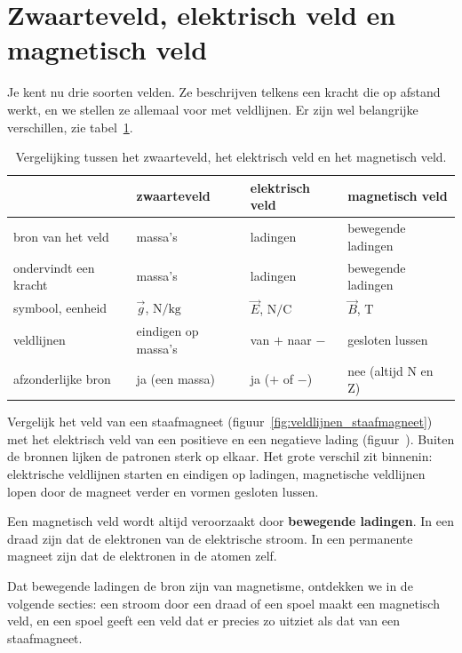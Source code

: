 \documentclass{ximera}
\begin{document}
\section{Zwaarteveld, elektrisch veld en magnetisch veld}\label{sec:analogie-velden}
Je kent nu drie soorten velden. Ze beschrijven telkens een kracht die op afstand werkt, en we stellen ze allemaal voor met veldlijnen. Er zijn wel belangrijke verschillen, zie tabel~\ref{tab:analogie_velden}.

\begin{table}[ht!]
    \begin{center}
        \begin{tabular}{l l l l}
            \toprule
            & zwaarteveld & elektrisch veld & magnetisch veld \\
            \midrule
            bron van het veld & massa's & ladingen & bewegende ladingen \\
            ondervindt een kracht & massa's & ladingen & bewegende ladingen \\
            symbool, eenheid & $\vec{g}$, $\mathrm{N/kg}$ & $\vec{E}$, $\mathrm{N/C}$ & $\vec{B}$, $\mathrm{T}$ \\
            veldlijnen & eindigen op massa's & van $+$ naar $-$ & gesloten lussen \\
            afzonderlijke bron & ja (een massa) & ja ($+$ of $-$) & nee (altijd N en Z) \\
            \bottomrule
        \end{tabular}
    \end{center}
    \caption{Vergelijking tussen het zwaarteveld, het elektrisch veld en het magnetisch veld.}
    \label{tab:analogie_velden}
\end{table}

Vergelijk het veld van een staafmagneet (figuur~\ref{fig:veldlijnen_staafmagneet}) met het elektrisch veld van een positieve en een negatieve lading (figuur~). Buiten de bronnen lijken de patronen sterk op elkaar. Het grote verschil zit binnenin: elektrische veldlijnen starten en eindigen op ladingen, magnetische veldlijnen lopen door de magneet verder en vormen gesloten lussen.

\begin{proposition}[foldable=true,title={Bron van het magnetisch veld}]\nl
    Een magnetisch veld wordt altijd veroorzaakt door \textbf{bewegende ladingen}. In een draad zijn dat de elektronen van de elektrische stroom. In een permanente magneet zijn dat de elektronen in de atomen zelf.
\end{proposition}

Dat bewegende ladingen de bron zijn van magnetisme, ontdekken we in de volgende secties: een stroom door een draad of een spoel maakt een magnetisch veld, en een spoel geeft een veld dat er precies zo uitziet als dat van een staafmagneet.
\end{document}
